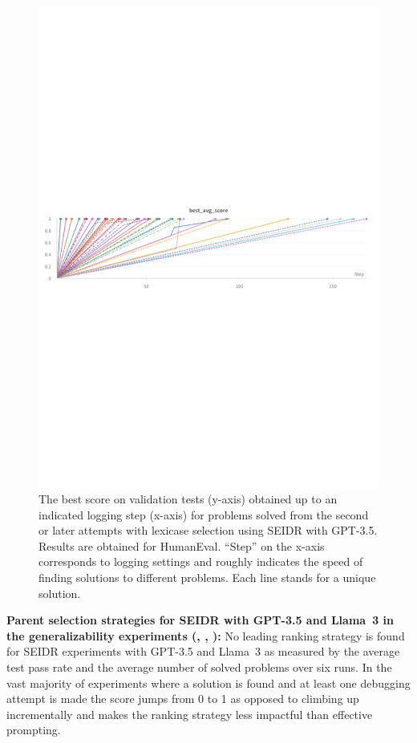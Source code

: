 \begin{figure}
\centering
\includegraphics[width=\linewidth, trim={2mm 123mm 3mm 130mm}, clip]{images/best-avg-score-seidr-telo-humaneval-gpt-3.5-turbo-run3.pdf}
\caption{The best score on validation tests (y-axis) obtained up to an indicated logging step (x-axis) for problems solved from the second or later attempts with lexicase selection using SEIDR with GPT-3.5. Results are obtained for HumanEval. ``Step'' on the x-axis corresponds to logging settings and roughly indicates the speed of finding solutions to different problems. Each line stands for a unique solution.}
\label{fig:lexicase-tpr-jumps}
\end{figure}

\begin{highlight}
\textbf{Parent selection strategies for SEIDR with GPT-3.5 and Llama~3 in the generalizability experiments (\rqllama{}, \rqmultirun{}, \rqlexicase{}):} 
No leading ranking strategy is found for SEIDR experiments with GPT-3.5 and Llama~3 as measured by the average test pass rate and the average number of solved problems over six runs. 
In the vast majority of experiments where a solution is found and at least one debugging attempt is made the score jumps from 0 to 1 as opposed to climbing up incrementally and makes the ranking strategy less impactful than effective prompting. 
\end{highlight}


